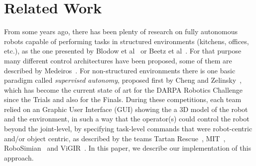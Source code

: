 \section{Related Work}
	\label{sec:related_work}
	
	From some years ago, there has been plenty of research on fully autonomous robots capable of performing
	tasks in structured environments (kitchens, offices, etc.), as the one presented by Blodow et al~\cite{Blodow}
	or Beetz et al~\cite{Beetz}.
	For that purpose many different control architectures have been proposed, some of them are described by
	Medeiros~\cite{Medeiros}.
	For non-structured environments there is one basic paradigm called \emph{supervised autonomy},
	proposed first by Cheng and Zelinsky~\cite{Cheng}, which has become the current state of art for
	the DARPA Robotics Challenge since the Trials and also for the Finals.
	During these competitions, each team relied on an Graphic User Interface (GUI) showing the a 3D model of the
	robot and the environment, in such a way that the operator(s) could control the robot beyond the joint-level,
	by specifying task-level commands that were robot-centric and/or object centric, as described by the teams
	Tartan Rescue~\cite{Dellin}, MIT~\cite{Fallon}, RoboSimian~\cite{Hebert} and ViGIR~\cite{Romay}.
	In this paper, we describe our implementation of this approach.